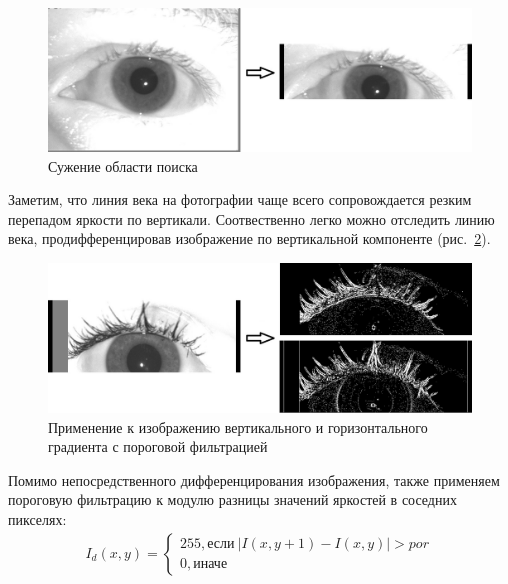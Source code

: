 \documentclass[12pt]{article} %
\begin{document}
\begin{figure}[h]
	
	\centering
	
	\includegraphics[width=0.8\linewidth]{glaz6.jpg}
	
	\caption{Сужение области поиска}
	
	\label{fig:glaz6}
	
\end{figure}

Заметим, что линия века на фотографии чаще всего сопровождается резким перепадом яркости по вертикали. Соотвественно легко можно отследить линию века, продифференцировав изображение по вертикальной компоненте (рис.~\ref{fig:glaz7}).

\begin{figure}[h]
	
	\centering
	
	\includegraphics[width=0.8\linewidth]{glaz7.jpg}
	
	\caption{Применение к изображению вертикального и горизонтального градиента с пороговой фильтрацией}
	
	\label{fig:glaz7}
	
\end{figure}

Помимо непосредственного дифференцирования изображения, также применяем пороговую фильтрацию к модулю разницы значений яркостей в соседних пикселях:
\begin{gather}\label{I_diff}
	 I_d(x,y) = \begin{cases}
	 	255, \text{если}~|I(x,y+1) - I(x,y)|> por
	 	\\
	 	0, \text{иначе}
	 \end{cases}
\end{gather}
\end{document}

